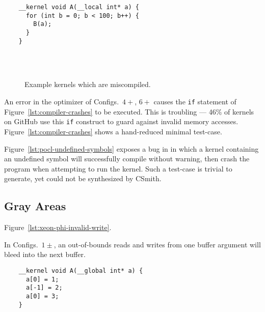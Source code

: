 \newsavebox{\PoclUndefinedSymbols}
\begin{lrbox}{\PoclUndefinedSymbols}
  \hspace{1.5em}
  \begin{lstlisting}
    __kernel void A(__local int* a) {
      for (int b = 0; b < 100; b++) {
        B(a);
      }
    }
  \end{lstlisting}
\end{lrbox}


\begin{figure}
  \centering %
  \\%
  \\%
  \caption{Example kernels which are miscompiled.}%
  \label{lst:wrong-code}%
\end{figure}


An error in the optimizer of Configs.\ $4+$, $6+$ causes the \texttt{if} statement of Figure~\ref{lst:compiler-crashes} to be executed.
This is troubling --- 46\% of kernels on GitHub use this \texttt{if} construct to guard against invalid memory accesses. Figure~\ref{lst:compiler-crashes} shows a hand-reduced minimal test-case.

Figure~\ref{lst:pocl-undefined-symbols} exposes a bug in in which a kernel containing an undefined symbol will successfully compile without warning, then crash the program when attempting to run the kernel. Such a test-case is trivial to generate, yet could not be synthesized by CSmith.


\subsection{Gray Areas}

Figure~\ref{lst:xeon-phi-invalid-write}.

In Configs.\ $1\pm$, an out-of-bounds reads and writes from one buffer argument will bleed into the next buffer.

\newsavebox{\XeonPhiInvalidWrite}
\begin{lrbox}{\XeonPhiInvalidWrite}
  \hspace{1.5em}
  \begin{lstlisting}
    __kernel void A(__global int* a) {
      a[0] = 1;
      a[-1] = 2;
      a[0] = 3;
    }
  \end{lstlisting}
\end{lrbox}


